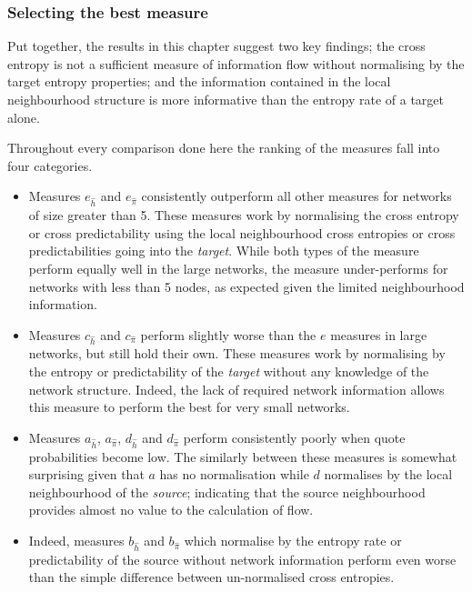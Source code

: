 \subsubsection{Selecting the best measure}
Put together, the results in this chapter suggest two key findings; the cross entropy is not a sufficient measure of information flow without normalising by the target entropy properties; and the information contained in the local neighbourhood structure is more informative than the entropy rate of a target alone.

Throughout every comparison done here the ranking of the measures fall into four categories.
\begin{itemize}
\item Measures $e_{\hat{h}}$ and $e_{\hat{\pi}}$ consistently outperform all other measures for networks of size greater than 5. These measures work by normalising the cross entropy or cross predictability using the local neighbourhood cross entropies or cross predictabilities going into the \emph{target}. While both types of the measure perform equally well in the large networks, the measure under-performs for networks with less than 5 nodes, as expected given the limited neighbourhood information.

\item Measures $c_{\hat{h}}$ and $c_{\hat{\pi}}$ perform slightly worse than the $e$ measures in large networks, but still hold their own. These measures work by normalising by the entropy or predictability of the \emph{target} without any knowledge of the network structure. Indeed, the lack of required network information allows this measure to perform the best for very small networks.

\item Measures $a_{\hat{h}}$,  $a_{\hat{\pi}}$, $d_{\hat{h}}$ and $d_{\hat{\pi}}$ perform consistently poorly when quote probabilities become low. The similarly between these measures is somewhat surprising given that $a$ has no normalisation while $d$ normalises by the local neighbourhood of the \emph{source}; indicating that the source neighbourhood provides almost no value to the calculation of flow.

\item Indeed, measures $b_{\hat{h}}$ and $b_{\hat{\pi}}$ which normalise by the entropy rate or predictability of the source without network information perform even worse than the simple difference between un-normalised cross entropies. 
\end{itemize}


